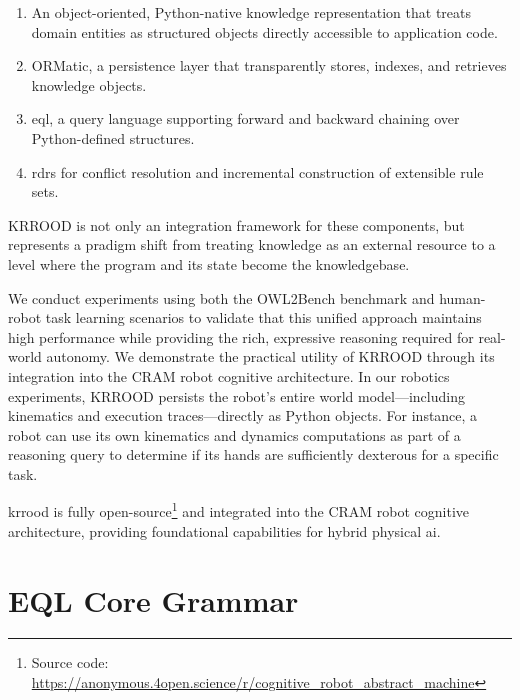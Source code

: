 \documentclass{article}
\begin{document}
\begin{enumerate}
\item An object-oriented, Python-native knowledge representation that treats domain entities as structured objects directly accessible to application code.

\item ORMatic, a persistence layer that transparently stores, indexes, and retrieves knowledge objects.

\item \ac{eql}, a query language supporting forward and backward chaining over Python-defined structures.

\item \acp{rdr} for conflict resolution and incremental construction of extensible rule sets.
\end{enumerate}

KRROOD is not only an integration framework for these components, but represents a pradigm shift from treating knowledge as an external resource to a level where the program and its state become the knowledgebase.

We conduct experiments using both the OWL2Bench benchmark and human-robot task learning scenarios to validate that this unified approach maintains high performance while providing the rich, expressive reasoning required for real-world autonomy.
We demonstrate the practical utility of KRROOD through its integration into the CRAM robot cognitive architecture. In our robotics experiments, KRROOD persists the robot’s entire world model—including kinematics and execution traces—directly as Python objects. For instance, a robot can use its own kinematics and dynamics computations as part of a reasoning query to determine if its hands are sufficiently dexterous for a specific task. 

\ac{krrood} is fully open-source\footnote{Source code: \url{https://anonymous.4open.science/r/cognitive_robot_abstract_machine}} and integrated into the CRAM robot cognitive architecture, providing foundational capabilities for hybrid physical \ac{ai}.


\appendix 




\appendix


\section{EQL Core Grammar}
\label{app:eql_grammar}
\end{document}
